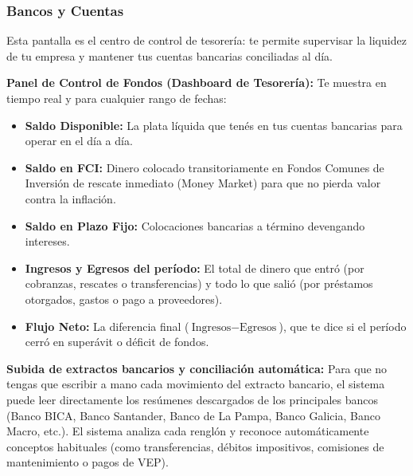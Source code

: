 \documentclass[12pt,a4paper]{article}
\renewcommand{\_}{\textunderscore\allowbreak}
\begin{document}
\subsubsection{Bancos y Cuentas}
Esta pantalla es el centro de control de tesorería: te permite supervisar la liquidez de tu empresa y mantener tus cuentas bancarias conciliadas al día.

\textbf{Panel de Control de Fondos (Dashboard de Tesorería):}
Te muestra en tiempo real y para cualquier rango de fechas:
\begin{itemize}
    \item \textbf{Saldo Disponible:} La plata líquida que tenés en tus cuentas bancarias para operar en el día a día.
    \item \textbf{Saldo en FCI:} Dinero colocado transitoriamente en Fondos Comunes de Inversión de rescate inmediato (Money Market) para que no pierda valor contra la inflación.
    \item \textbf{Saldo en Plazo Fijo:} Colocaciones bancarias a término devengando intereses.
    \item \textbf{Ingresos y Egresos del período:} El total de dinero que entró (por cobranzas, rescates o transferencias) y todo lo que salió (por préstamos otorgados, gastos o pago a proveedores).
    \item \textbf{Flujo Neto:} La diferencia final ($\text{Ingresos} - \text{Egresos}$), que te dice si el período cerró en superávit o déficit de fondos.
\end{itemize}

\textbf{Subida de extractos bancarios y conciliación automática:}
Para que no tengas que escribir a mano cada movimiento del extracto bancario, el sistema puede leer directamente los resúmenes descargados de los principales bancos (Banco BICA, Banco Santander, Banco de La Pampa, Banco Galicia, Banco Macro, etc.). El sistema analiza cada renglón y reconoce automáticamente conceptos habituales (como transferencias, débitos impositivos, comisiones de mantenimiento o pagos de VEP).
\end{document}
